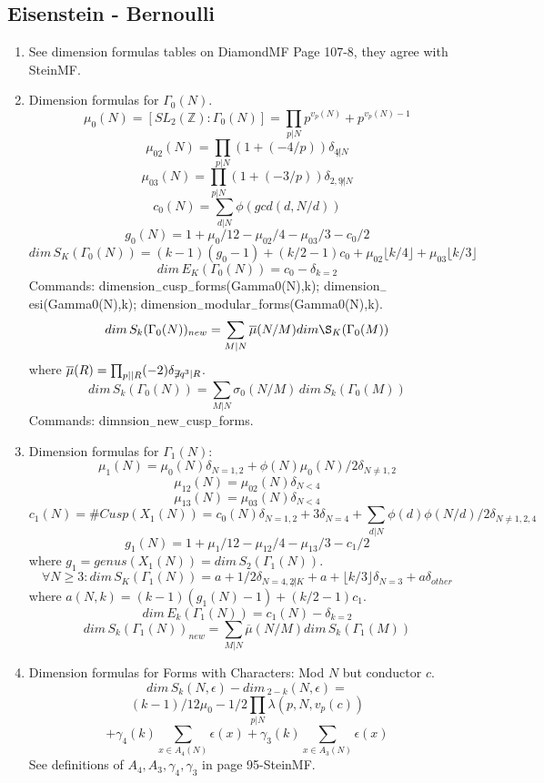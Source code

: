 \documentclass{article}
\newcommand{\Z}{\mathbb{Z}}
\begin{document}
\subsection{Eisenstein - Bernoulli}
\begin{multicols}{2}
\begin{enumerate}
\item See dimension formulas tables on DiamondMF Page 107-8, they agree with SteinMF.
\item Dimension formulas for $\Gamma_0(N)$.
\[\mu_0(N) = [SL_2(\Z):\Gamma_0(N)] = \prod_{p|N} p^{v_p(N)} + p^{v_p(N)-1}\]
\[\mu_{02}(N) = \prod_{p|N} (1+(-4/p)) \delta_{4\not|N}\]
\[\mu_{03}(N) = \prod_{p|N} (1+(-3/p)) \delta_{2,9\not|N}\]
\[c_0(N) = \sum_{d|N} \phi(gcd(d,N/d))\]
\[g_0(N) = 1 + \mu_0/12 - \mu_{02}/4 - \mu_{03}/3 - c_0/2\]
\[dim\,S_K(\Gamma_0(N)) = (k-1)(g_0 - 1) + (k/2-1)c_0 + \mu_{02}\lfloor k/4\rfloor + \mu_{03}\lfloor k/3 \rfloor\]
\[dim\,E_K(\Gamma_0(N)) = c_0 - \delta_{k = 2}\]
Commands: dimension$_-$cusp$_-$forms(Gamma0(N),k); dimension$_-$esi(Gamma0(N),k); dimension$_-$modular$_-$forms(Gamma0(N),k). 
\[dim\,S_k(\Gamma_0(N))_{new} = \sum_{M|N} \overline{\mu}(N/M) dim\S_K(\Gamma_0(M))\]
where $\overline{\mu}(R) = \prod_{p||R}(-2) \delta_{\not\exists q^3|R}$.
\[dim\,S_k(\Gamma_0(N)) = \sum_{M|N} \sigma_0(N/M) \, dim\,S_k(\Gamma_0(M))\]
Commands: dimnsion$_-$new$_-$cusp$_-$forms.

\item Dimension formulas for $\Gamma_1(N)$:
\[\mu_1(N) = \mu_0(N) \delta_{N = 1,2} + \phi(N) \mu_0(N)/2 \delta_{N \neq 1,2}\]
\[\mu_{12}(N) = \mu_{02}(N)\delta_{N < 4}\]
\[\mu_{13}(N) = \mu_{03}(N) \delta_{N < 4}\]
\[c_1(N) = \#Cusp(X_1(N)) = c_0(N) \delta_{N = 1,2} + 3\delta_{N = 4} + \sum_{d|N}\phi(d)\phi(N/d)/2 \delta_{N \neq 1,2,4}\]
\[g_1(N) = 1 + \mu_1/12 - \mu_{12}/4 - \mu_{13}/3 - c_1/2\]
where $g_1 = genus(X_1(N)) = dim\,S_2(\Gamma_1(N))$. 
\[\forall N \geq 3: dim\,S_K(\Gamma_1(N)) = a+1/2\delta_{N = 4, 2\not|K} + a + \lfloor k/3 \rfloor \delta_{N = 3} + a\delta_{other}\]
where $a(N,k) = (k-1)(g_1(N) - 1) + (k/2 - 1) c_1$.
\[dim\,E_k(\Gamma_1(N)) = c_1(N) - \delta_{k = 2}\]
\[dim\,S_k(\Gamma_1(N))_{new} = \sum_{M|N}\overline{\mu}(N/M) dim\,S_k(\Gamma_1(M))\]

\item Dimension formulas for Forms with Characters: Mod $N$ but conductor $c$.
\[dim\,S_k(N,\epsilon) - dim\,_{2-k}(N,\epsilon) =\]
\[(k-1)/12 \mu_0 - 1/2\prod_{p|N} \lambda(p,N,v_p(c)) \]
\[+ \gamma_4(k) \sum_{x \in A_4(N)} \epsilon(x) + \gamma_3(k) \sum_{x \in A_3(N)} \epsilon(x)\]
See definitions of $A_4,A_3,\gamma_4,\gamma_3$ in page 95-SteinMF.




\end{enumerate}
\end{multicols}
\end{document}
